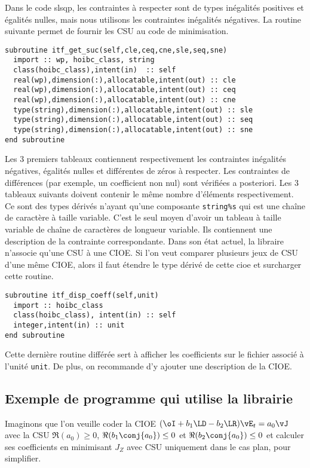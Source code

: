       Dans le code slsqp, les contraintes à respecter sont de types inégalités positives et égalités nulles, mais nous utilisons les contraintes inégalités négatives. La routine suivante permet de fournir les CSU au code de minimisation.
\begin{lstlisting}
subroutine itf_get_suc(self,cle,ceq,cne,sle,seq,sne)
  import :: wp, hoibc_class, string
  class(hoibc_class),intent(in)  :: self
  real(wp),dimension(:),allocatable,intent(out) :: cle
  real(wp),dimension(:),allocatable,intent(out) :: ceq
  real(wp),dimension(:),allocatable,intent(out) :: cne
  type(string),dimension(:),allocatable,intent(out) :: sle
  type(string),dimension(:),allocatable,intent(out) :: seq
  type(string),dimension(:),allocatable,intent(out) :: sne
end subroutine
\end{lstlisting}
      Les 3 premiers tableaux contiennent respectivement les contraintes inégalités négatives, égalités nulles et différentes de zéros à respecter. Les contraintes de différences (par exemple, un coefficient non nul) sont vérifiées a posteriori.
      Les 3 tableaux suivants doivent contenir le même nombre d'éléments respectivement. Ce sont des types dérivés n'ayant qu'une composante \lstinline{string%s} qui est une chaîne de caractère à taille variable. C'est le seul moyen d'avoir un tableau à taille variable de chaîne de caractères de longueur variable. Ils contiennent une description de la contrainte correspondante.
      Dans son état actuel, la libraire n'associe qu'une CSU à une CIOE. Si l'on veut comparer plusieurs jeux de CSU d'une même CIOE, alors il faut étendre le type dérivé de cette cioe et surcharger cette routine.

\begin{lstlisting}
subroutine itf_disp_coeff(self,unit)
  import :: hoibc_class
  class(hoibc_class), intent(in) :: self
  integer,intent(in) :: unit
end subroutine
\end{lstlisting}
      Cette dernière routine différée sert à afficher les coefficients sur le fichier associé à l'unité \lstinline{unit}. De plus, on recommande d'y ajouter une description de la CIOE.

  \subsection{Exemple de programme qui utilise la librairie}

    Imaginons que l'on veuille coder la CIOE \((\oI+b_1\LD-b_2\LR)\vE_t = a_0\vJ\) avec la CSU \(\Re(a_0) \ge 0\), \(\Re(b_1\conj{a_0}) \le 0\) et \(\Re(b_2\conj{a_0}) \le 0\) et calculer ses coefficients en minimisant \(J_Z\) avec CSU uniquement dans le cas plan, pour simplifier.
    
